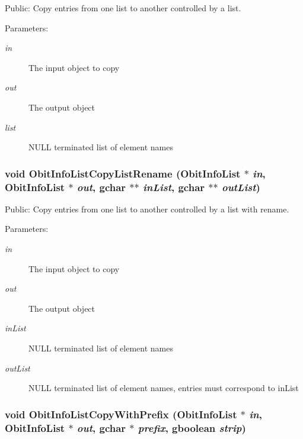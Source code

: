 Public: Copy entries from one list to another controlled by a list. 

\begin{Desc}
\item[Parameters:]
\begin{description}
\item[{\em in}]The input object to copy \item[{\em out}]The output object \item[{\em list}]NULL terminated list of element names \end{description}
\end{Desc}
\subsubsection{\setlength{\rightskip}{0pt plus 5cm}void Obit\-Info\-List\-Copy\-List\-Rename ({\bf Obit\-Info\-List} $\ast$ {\em in}, {\bf Obit\-Info\-List} $\ast$ {\em out}, gchar $\ast$$\ast$ {\em in\-List}, gchar $\ast$$\ast$ {\em out\-List})}\label{ObitInfoList_8h_a7}


Public: Copy entries from one list to another controlled by a list with rename. 

\begin{Desc}
\item[Parameters:]
\begin{description}
\item[{\em in}]The input object to copy \item[{\em out}]The output object \item[{\em in\-List}]NULL terminated list of element names \item[{\em out\-List}]NULL terminated list of element names, entries must correspond to in\-List \end{description}
\end{Desc}
\subsubsection{\setlength{\rightskip}{0pt plus 5cm}void Obit\-Info\-List\-Copy\-With\-Prefix ({\bf Obit\-Info\-List} $\ast$ {\em in}, {\bf Obit\-Info\-List} $\ast$ {\em out}, gchar $\ast$ {\em prefix}, gboolean {\em strip})}\label{ObitInfoList_8h_a9}


